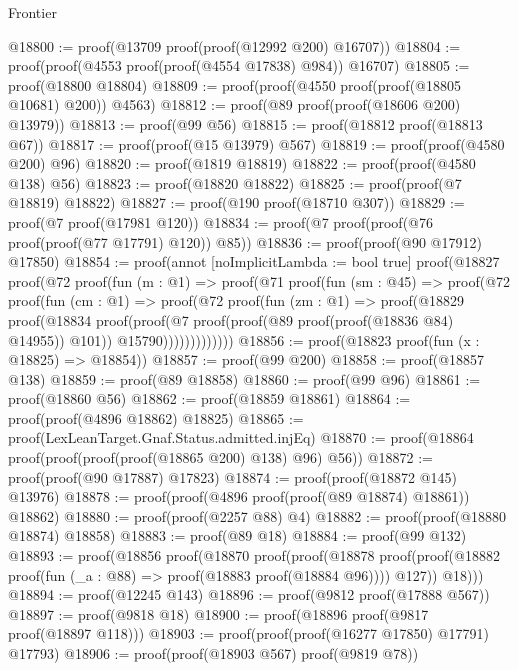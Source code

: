 \begin{lexlean}{Frontier}
\begin{coremodule}
@18800 := proof(@13709 proof(proof(@12992 @200) @16707))
@18804 := proof(proof(@4553 proof(proof(@4554 @17838) @984)) @16707)
@18805 := proof(@18800 @18804)
@18809 := proof(proof(@4550 proof(proof(@18805 @10681) @200)) @4563)
@18812 := proof(@89 proof(proof(@18606 @200) @13979))
@18813 := proof(@99 @56)
@18815 := proof(@18812 proof(@18813 @67))
@18817 := proof(proof(@15 @13979) @567)
@18819 := proof(proof(@4580 @200) @96)
@18820 := proof(@1819 @18819)
@18822 := proof(proof(@4580 @138) @56)
@18823 := proof(@18820 @18822)
@18825 := proof(proof(@7 @18819) @18822)
@18827 := proof(@190 proof(@18710 @307))
@18829 := proof(@7 proof(@17981 @120))
@18834 := proof(@7 proof(proof(@76 proof(proof(@77 @17791) @120)) @85))
@18836 := proof(proof(@90 @17912) @17850)
@18854 := proof(annot [noImplicitLambda := bool true]
    proof(@18827
        proof(@72
            proof(fun (m : @1) =>
              proof(@71
                  proof(fun (sm : @45) =>
                    proof(@72
                        proof(fun (cm : @1) =>
                          proof(@72
                              proof(fun (zm : @1) =>
                                proof(@18829
                                    proof(@18834
                                        proof(proof(@7
                                              proof(proof(@89 proof(proof(@18836 @84) @14955))
                                                  @101))
                                            @15790)))))))))))))
@18856 := proof(@18823 proof(fun (x : @18825) => @18854))
@18857 := proof(@99 @200)
@18858 := proof(@18857 @138)
@18859 := proof(@89 @18858)
@18860 := proof(@99 @96)
@18861 := proof(@18860 @56)
@18862 := proof(@18859 @18861)
@18864 := proof(proof(@4896 @18862) @18825)
@18865 := proof(LexLeanTarget.Gnaf.Status.admitted.injEq)
@18870 := proof(@18864 proof(proof(proof(proof(@18865 @200) @138) @96) @56))
@18872 := proof(proof(@90 @17887) @17823)
@18874 := proof(proof(@18872 @145) @13976)
@18878 := proof(proof(@4896 proof(proof(@89 @18874) @18861)) @18862)
@18880 := proof(proof(@2257 @88) @4)
@18882 := proof(proof(@18880 @18874) @18858)
@18883 := proof(@89 @18)
@18884 := proof(@99 @132)
@18893 := proof(@18856
      proof(@18870
          proof(proof(@18878
                proof(proof(@18882 proof(fun (_a : @88) => proof(@18883 proof(@18884 @96)))) @127))
              @18)))
@18894 := proof(@12245 @143)
@18896 := proof(@9812 proof(@17888 @567))
@18897 := proof(@9818 @18)
@18900 := proof(@18896 proof(@9817 proof(@18897 @118)))
@18903 := proof(proof(proof(@16277 @17850) @17791) @17793)
@18906 := proof(proof(@18903 @567) proof(@9819 @78))

\end{coremodule}
\end{lexlean}
